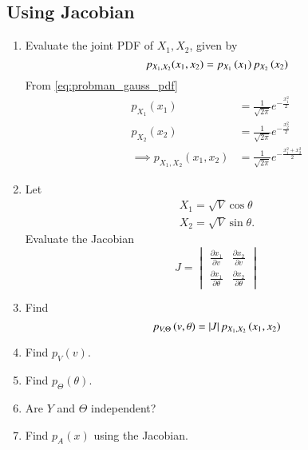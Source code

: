 \subsection{Using Jacobian}
%
\begin{enumerate}[label=\thesubsection.\arabic*.,ref=\thesubsection.\theenumi]

\item
Evaluate the joint PDF of $X_1,X_2$,  given by
%
\begin{equation}
p_{X_1,X_2}(x_1,x_2) = p_{X_1}\left(x_1\right)p_{X_2}\left(x_2\right)
\end{equation}
%
\solution From \eqref{eq:probman_gauss_pdf}
\begin{align}
p_{X_1}(x_1)&=\frac {1}{\sqrt {2\pi }}e^{-\frac {x_1^2}{2}}
\\
p_{X_2}(x_2)&=\frac {1}{\sqrt {2\pi }}e^{-\frac {x_2^2}{2}}
\\
\implies p_{X_1,X_2}(x_1,x_2) &= \frac {1}{\sqrt {2\pi }}e^{-\frac {x_1^2+x_2^2}{2}}
\end{align}
 
%
\item
Let 
\begin{align}
 X_1 = \sqrt{V}\cos \theta
\\
 X_2 = \sqrt{V} \sin \theta.
\end{align}
Evaluate the Jacobian 
%
\begin{equation}
J =
\begin{vmatrix}
\frac{\partial x_1}{\partial v} & \frac{\partial x_2}{\partial v} \\
\frac{\partial x_1}{\partial \theta} & \frac{\partial x_2}{\partial \theta} 
\end{vmatrix}
\end{equation}
%

%
\item
Find
%
\begin{equation}
p_{V,\Theta}\left(v,\theta\right) = \left\vert J\right\vert p_{X_1,X_2}\left(x_1,x_2\right)
\end{equation}
%

%
\item
Find $p_{V}(v)$.  

%
%
\item
Find $p_{\Theta}(\theta)$.  

%
\item
Are $Y$ and $\Theta$ independent?

\item
Find $p_{A}(x)$ using the Jacobian.

%
%

%
%
%
\end{enumerate}

